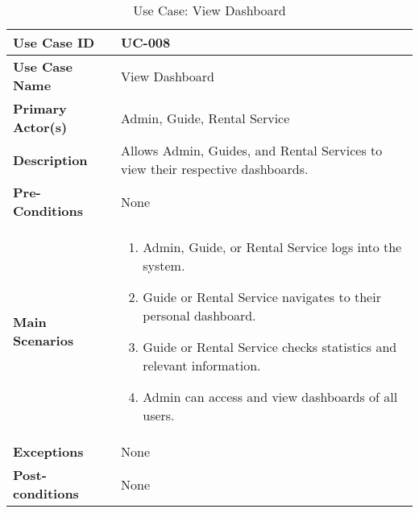 \begin{table}[ht]
    \centering
    \begin{tabular}{|l|p{}|}
        \hline
        \textbf{Use Case ID} & UC-008 \\
        \hline
        \textbf{Use Case Name} & View Dashboard \\
        \hline
        \textbf{Primary Actor(s)} & Admin, Guide, Rental Service \\
        \hline
        \textbf{Description} & Allows Admin, Guides, and Rental Services to view their respective dashboards. \\
        \hline
        \textbf{Pre-Conditions} & None \\
        \hline
        \textbf{Main Scenarios} & 
        \begin{enumerate}[label=\arabic*.,itemsep=0pt]
            \item Admin, Guide, or Rental Service logs into the system.
            \item Guide or Rental Service navigates to their personal dashboard.
            \item Guide or Rental Service checks statistics and relevant information.
            \item Admin can access and view dashboards of all users.
        \end{enumerate} \\
        \hline
        \textbf{Exceptions} & None \\
        \hline
        \textbf{Post-conditions} & None \\
        \hline
    \end{tabular}
    \label{tab:use-case-view-dashboard}
    \caption{Use Case: View Dashboard}
\end{table}


